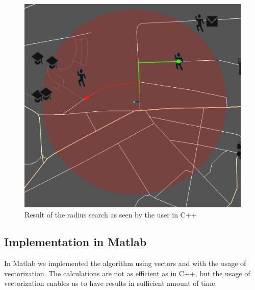 \begin{figure}[h]
\centering
\includegraphics[width=0.8\linewidth]{../pictures/search_radius_result.jpg}
\caption{Result of the radius search as seen by the user in C++}
\label{fig:radius_result}
\end{figure}

 \subsection{Implementation in Matlab}
 In Matlab we implemented the algorithm using vectors and with the usage of vectorization. The calculations are not as efficient as in C++, but the usage of vectorization enables us to have results in sufficient amount of time. 
 
 
